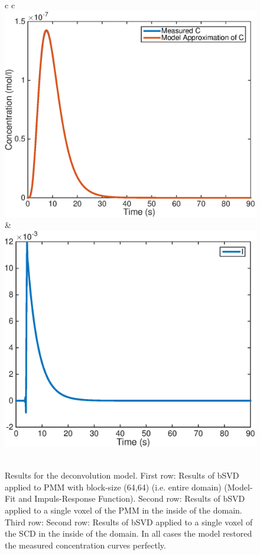 \documentclass[paper=a4, fontsize=11pt,parskip=half,headings=small]{scrartcl}
\begin{document}
\begin{figure}[H]
\begin{tabular}{c c}
				 \includegraphics[width = .45\textwidth]{./figs/C-and-Crec-conv.eps} & \includegraphics[width = .45\textwidth]{./figs/Irec-conv.eps} \\			 
				  \\				 				 
			\end{tabular}
		\caption{Results for the deconvolution model. First row: Results of bSVD applied to PMM with block-size (64,64) (i.e. entire domain) (Model-Fit and Impuls-Response Function). Second row: Results of bSVD applied to a single voxel of the PMM in the inside of the domain. Third row: Second row: Results of bSVD applied to a single voxel of the SCD in the inside of the domain. In all cases the model restored the measured concentration curves perfectly.}			
		\label{fig:deconvResults}
	\end{figure}

	
	
\end{document}
